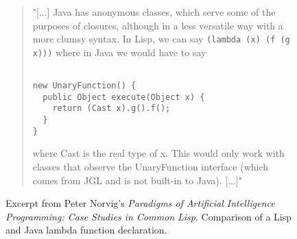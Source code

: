 \begin{figure}[ht]

\begin{quote}
"[...] Java has anonymous classes, which serve some of the purposes of closures, although in a less versatile way with a more clumsy syntax. In Lisp, we can say \texttt{(lambda (x) (f (g x)))} where in Java we would have to say

\begin{verbatim}

new UnaryFunction() { 
  public Object execute(Object x) {
    return (Cast x).g().f();
  }
}
\end{verbatim}
where Cast is the real type of x. This would only work with classes that observe the UnaryFunction interface (which comes from JGL and is not built-in to Java). [...]"
\end{quote}

\caption{Excerpt from Peter Norvig's \textit{Paradigms of Artificial Intelligence Programming: Case Studies in Common Lisp}. Comparison of a Lisp and Java lambda function declaration.\cite{PAIP.Norvig}}
\label{fig:norvig-lisp-comparison}
\end{figure}
